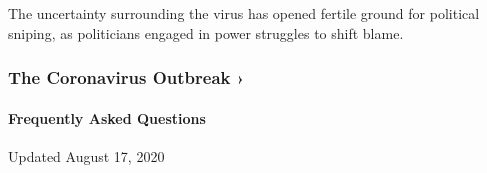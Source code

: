 The uncertainty surrounding the virus has opened fertile ground for
political sniping, as politicians engaged in power struggles to shift
blame.

\href{https://www.nytimes3xbfgragh.onion/news-event/coronavirus?action=click\&pgtype=Article\&state=default\&region=MAIN_CONTENT_3\&context=storylines_faq}{}

\hypertarget{the-coronavirus-outbreak-}{%
\subsubsection{The Coronavirus Outbreak
›}\label{the-coronavirus-outbreak-}}

\hypertarget{frequently-asked-questions}{%
\paragraph{Frequently Asked
Questions}\label{frequently-asked-questions}}

Updated August 17, 2020

